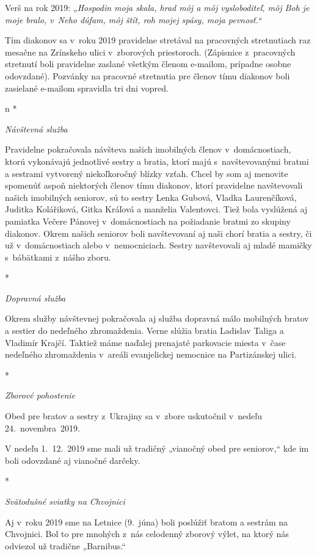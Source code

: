 

Verš na rok 2019: {\it „Hospodin moja skala, hrad môj a môj vysloboditeľ, môj Boh je moje bralo, v~Neho dúfam, môj štít, roh mojej spásy, moja pevnosť.“}


Tím diakonov sa v~roku 2019 pravidelne stretával na pracovných stretnutiach raz mesačne na Zrínskeho ulici v~zborových priestoroch. (Zápisnice z~pracovných stretnutí boli pravidelne zaslané všetkým členom e-mailom, prípadne osobne odovzdané). Pozvánky na pracovné stretnutia pre členov tímu diakonov boli zasielané e-mailom spravidla tri dni vopred.

\def\aktivita#1{{\it #1\par}\firstnoindent}

\begitems \style n
* \aktivita{Návštevná služba}
Pravidelne pokračovala návšteva našich imobilných členov v~domácnostiach, ktorú vykonávajú jednotlivé sestry a bratia, ktorí majú s~navštevovanými bratmi a sestrami vytvorený niekoľkoročný blízky vzťah. Chcel by som aj menovite spomenúť aspoň niektorých členov tímu diakonov, ktorí pravidelne navštevovali našich imobilných seniorov, sú to sestry Lenka Gubová, Vladka Laurenčíková, Juditka Kolářiková, Gitka Kráľová a manželia Valentovci. Tiež bola vyslúžená aj pamiatka Večere Pánovej v~domácnostiach na požiadanie bratmi zo skupiny diakonov. Okrem našich seniorov boli navštevovaní aj naši chorí bratia a sestry, či už v~domácnostiach alebo v~nemocniciach. Sestry navštevovali aj mladé mamičky s~bábätkami z~nášho zboru.

* \aktivita{Dopravná služba}
Okrem služby návštevnej pokračovala aj služba dopravná málo mobilných bratov a sestier do nedeľného zhromaždenia. Verne slúžia bratia Ladislav Taliga a Vladimír Krajčí. Taktiež máme naďalej prenajaté parkovacie miesta v~čase nedeľného zhromaždenia v~areáli evanjelickej nemocnice na Partizánskej ulici.

* \aktivita{Zborové pohostenie}
Obed pre bratov a sestry z~Ukrajiny sa v~zbore uskutočnil v~nedeľu 24.~novembra~2019.

V nedeľu 1.~12.~2019 sme mali už tradičný „vianočný obed pre seniorov,“ kde im boli odovzdané aj vianočné darčeky.

* \aktivita{Svätodušné sviatky na Chvojnici}
Aj v~roku 2019 sme  na Letnice (9.~júna)  boli poslúžiť bratom a sestrám na Chvojnici. Bol to pre mnohých z~nás celodenný zborový výlet, na ktorý nás odviezol už tradične „Barnibus.“

